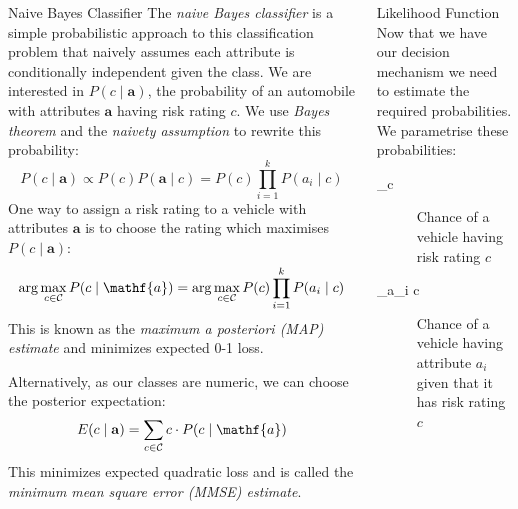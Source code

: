 \documentclass{beamer}
\newcommand{\defn}[1]{\textit{\color{ETH10}#1}}
\begin{document}
\begin{frame}
\begin{columns}
\begin{column}{0.30\paperwidth}
		\begin{block}{Naive Bayes Classifier}
			The \defn{naive Bayes classifier} is a simple probabilistic approach to this classification problem that naively assumes each attribute is conditionally independent given the class.
			We are interested in $P(c \mid \mathbf{a})$, the probability of an automobile with attributes $\mathbf{a}$ having risk rating $c$.
			We use \defn{Bayes theorem} and the \defn{naivety assumption} to rewrite this probability:
			\begin{equation}
				P(c \mid \mathbf{a}) \propto P(c)P(\mathbf{a} \mid c) = P(c)\prod_{i=1}^{k}P(a_i \mid c)
			\end{equation}
			One way to assign a risk rating to a vehicle with attributes $\mathbf{a}$ is to choose the rating which maximises $P(c \mid \mathbf{a})$:
			\begin{equation} \label{map_estimate}
				\arg\max_{c \in \mathcal{C}} P(c \mid \mathf{a}) = \arg\max_{c \in \mathcal{C}} P(c)\prod_{i=1}^{k}P(a_i \mid c)
			\end{equation}
			This is known as the \defn{maximum a posteriori (MAP) estimate} and minimizes expected 0-1 loss.

			Alternatively, as our classes are numeric, we can choose the posterior expectation:
			\begin{equation}
				E(c \mid \mathbf{a}) = \sum_{c \in \mathcal{C}} c \cdot P(c \mid \mathf{a})
			\end{equation}
			This minimizes expected quadratic loss and is called the \defn{minimum mean square error (MMSE) estimate}.

		\end{block}

	\end{column}

	\begin{column}{0.38\paperwidth}

		\begin{block}{Likelihood Function}
			Now that we have our decision mechanism we need to estimate the required probabilities.
			We parametrise these probabilities:
			\begin{description}
				\item[\theta_c] Chance of a vehicle having risk rating $c$
				\item[\theta_{a_i \mid c}] Chance of a vehicle having attribute $a_i$ given that it has risk rating $c$
			\end{description}\vspace{0.5em}


\end{block}
\end{column}
\end{columns}
\end{frame}
\end{document}
